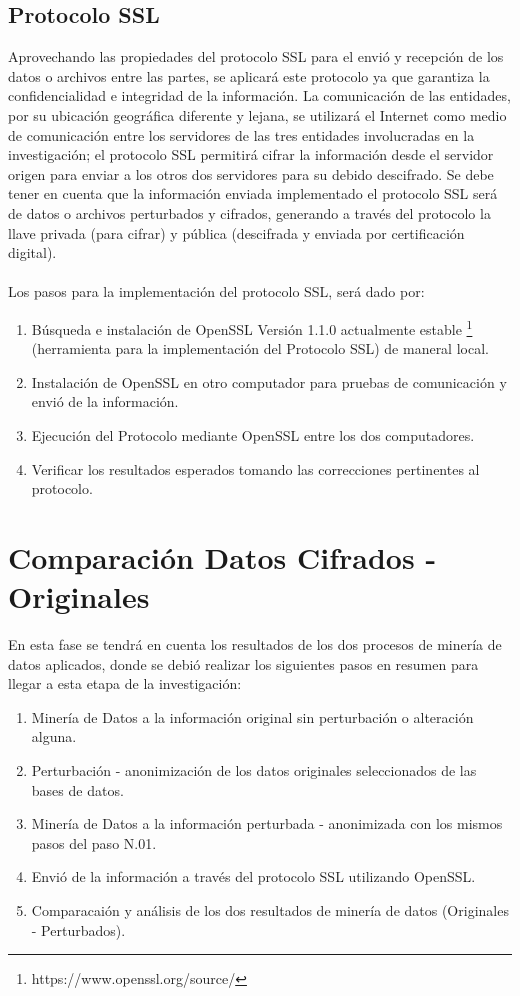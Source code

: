 \documentclass[a4paper,openright,12pt]{book}
\theoremstyle{definition}
\theoremstyle{remark}
\begin{document}
	 \subsection{Protocolo SSL}
     Aprovechando las propiedades del protocolo SSL para el envió y recepción de los datos o archivos entre las partes, se aplicará este protocolo ya que garantiza la confidencialidad e integridad de la información. La comunicación de las entidades, por su ubicación geográfica diferente y lejana, se utilizará el Internet como medio de comunicación entre los servidores de las tres entidades involucradas en la investigación; el protocolo SSL permitirá cifrar la información desde el servidor origen para enviar a los otros dos servidores para su debido descifrado. Se debe tener en cuenta que la información enviada implementado el protocolo SSL será de datos o archivos perturbados y cifrados, generando a través del protocolo la llave privada (para cifrar) y pública (descifrada y enviada por certificación digital).\\\\
Los pasos para la implementación del protocolo SSL, será dado por:
\begin{enumerate}
	\item Búsqueda e instalación de OpenSSL Versión 1.1.0 actualmente estable \footnote{https://www.openssl.org/source/} (herramienta para la implementación del Protocolo SSL) de maneral local.
    \item Instalación de OpenSSL en otro computador para pruebas de comunicación y envió de la información.
    \item Ejecución del Protocolo mediante OpenSSL entre los dos computadores.
    \item Verificar los resultados esperados tomando las correcciones pertinentes al protocolo.
\end{enumerate}

     \section{Comparación Datos Cifrados - Originales}
En esta fase se tendrá en cuenta los resultados de los dos procesos de minería de datos aplicados, donde se debió realizar los siguientes pasos en resumen para llegar a esta etapa de la investigación:
\begin{enumerate}
	\item Minería de Datos a la información original sin perturbación o alteración alguna.
    \item Perturbación - anonimización de los datos originales seleccionados de las bases de datos.
    \item Minería de Datos a la información perturbada - anonimizada con los mismos pasos del paso N.01.
    \item Envió de la información a través del protocolo SSL utilizando OpenSSL.
    \item Comparacaión y análisis de los dos resultados de minería de datos (Originales - Perturbados).
\end{enumerate}
\end{document}
